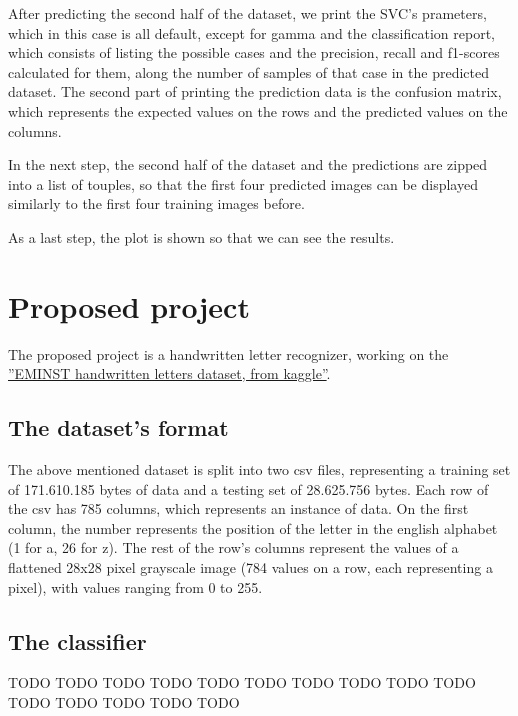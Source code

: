 \documentclass[a4paper,10pt]{report}
\begin{document}
 After predicting the second half of the dataset, we print the SVC's prameters, which in this case is all default, except for gamma and the classification report, which consists of listing the possible cases and the precision, recall and f1-scores calculated for them, along the number of samples of that case in the predicted dataset. The second part of printing the prediction data is the confusion matrix, which represents the expected values on the rows and the predicted values on the columns.
 
 In the next step, the second half of the dataset and the predictions are zipped into a list of touples, so that the first four predicted images can be displayed similarly to the first four training images before.
 
 As a last step, the plot is shown so that we can see the results.
 
 
\chapter{Proposed project}
 The proposed project is a handwritten letter recognizer, working on the \href{https://www.kaggle.com/ashishguptajiit/handwritten-az/}{''EMINST handwritten letters dataset, from kaggle''}.
 
 \section{The dataset's format}
 The above mentioned dataset is split into two csv files, representing a training set of 171.610.185 bytes of data and a testing set of 28.625.756 bytes.
 Each row of the csv has 785 columns, which represents an instance of data.
 On the first column, the number represents the position of the letter in the english alphabet (1 for a, 26 for z).
 The rest of the row's columns represent the values of a flattened 28x28 pixel grayscale image (784 values on a row, each representing a pixel), with values ranging from 0 to 255.
 
 \section{The classifier}
 TODO TODO TODO TODO TODO TODO TODO TODO TODO TODO TODO TODO TODO TODO TODO 
 
\end{document}
